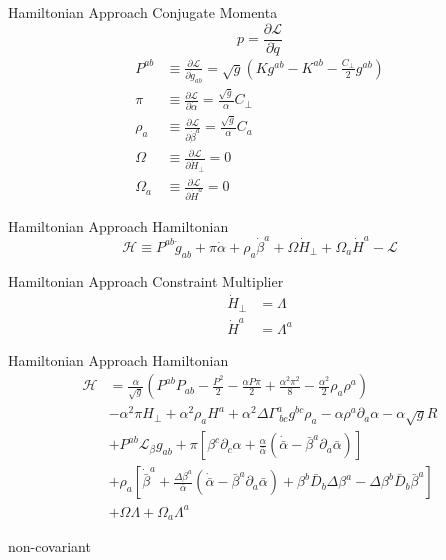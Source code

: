 \documentclass[xcolor=dvipsnames]{beamer}
\begin{document}
	\begin{frame}{Hamiltonian Approach}
		Conjugate Momenta
		\[
		p = \frac{\partial \mathscr{L}}{\partial {\dot q}}
		\]
		\pause
		\begin{align*}
			P^{ab} & \equiv \frac{\partial \mathscr{L}}{\partial {\dot g}_{ab}} = \sqrt{g}\left(Kg^{ab} - K^{ab} - \frac{C_{\perp}}{2}g^{ab}\right)\\
				\pi & \equiv \frac{\partial \mathscr{L}}{\partial {\dot \alpha}} = \frac{\sqrt{g}}{\alpha}C_{\perp}\\
				\rho_{a} & \equiv \frac{\partial \mathscr{L}}{\partial {\dot \beta}^{a}} = \frac{\sqrt{g}}{\alpha}C_{a}\\
				\Omega & \equiv \frac{\partial \mathscr{L}}{\partial {\dot H}_{\perp}} = 0\\
				\Omega_{a} & \equiv \frac{\partial \mathscr{L}}{\partial {\dot H}^{a}} = 0	
		\end{align*}
	\end{frame}
	\begin{frame}{Hamiltonian Approach}
		Hamiltonian
		\[
		\mathscr{H} \equiv P^{ab}{\dot g}_{ab} + \pi{\dot \alpha} + \rho_{a}{\dot \beta}^{a} + \Omega {\dot H}_{\perp} + \Omega_{a}{\dot H}^{a} - \mathscr{L}
		\]
	\end{frame}
	\begin{frame}{Hamiltonian Approach}
		Constraint Multiplier
		\begin{align*}
		{\dot H}_{\perp} & = \Lambda\\
		{\dot H}^{a} & = \Lambda^{a}
	\end{align*}
	\end{frame}
	\begin{frame}{Hamiltonian Approach}
		Hamiltonian
		\begin{align*}
			\mathscr{H} &= \frac{\alpha}{\sqrt{g}}\left(P^{ab}P_{ab} - \frac{P^{2}}{2} - \frac{\alpha P \pi}{2} + \frac{\alpha^{2}\pi^{2}}{8} - \frac{\alpha^{2}}{2}\rho_{a}\rho^{a}\right)\\
			& -\alpha^{2}\pi H_{\perp} + \alpha^{2}\rho_{a}H^{a} + \alpha^{2}\Delta\Gamma^{a}_{~bc}g^{bc}\rho_{a} - \alpha \rho^{a}\partial_{a}\alpha - \alpha\sqrt{g}R\\
			& + P^{ab} \mathcal{L}_{\beta}g_{ab} + \pi \left[\beta^{c}\partial_{c}\alpha + \frac{\alpha}{{\bar \alpha}}\left({\dot {\bar \alpha}} - {\bar \beta}^{a}\partial_{a}{\bar \alpha}\right)\right]\\
			& + \rho_{a}\left[{\dot {\bar \beta}}^{a} + \frac{\Delta \beta^{a}}{{\bar \alpha}}\left({\dot {\bar \alpha}} - {\bar \beta}^{a}\partial_{a}{\bar \alpha}\right) + \beta^{b}{\bar D}_{b}\Delta \beta^{a} - \Delta \beta^{b} {\bar D}_{b}{\bar \beta}^{a}\right]\\
			& + \Omega \Lambda + \Omega_{a}\Lambda^{a}
			\end{align*}
		\pause
		\Large
		\begin{center}
		non-covariant
		\end{center}
	\end{frame}
\end{document}

